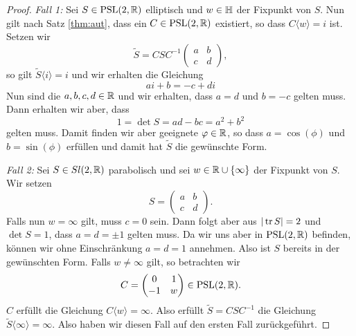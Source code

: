 \begin{proof}
  \emph{Fall 1:} Sei $S \in \operatorname{PSL}(2, \mathbb{R})$ elliptisch und $w \in \mathbb{H}$ der
  Fixpunkt von $S$. Nun gilt nach Satz \ref{thm:aut}, dass ein $C \in
  \operatorname{PSL}(2,\mathbb{R})$ existiert, so dass $C \langle w \rangle = i$ ist. Setzen
  wir
  \[
  \tilde S = CSC^{-1}
  \begin{pmatrix}
    a & b\\
    c & d
  \end{pmatrix},
  \]
  so gilt $\tilde S\langle i \rangle = i$ und wir erhalten die
  Gleichung
  \[
  ai +b = -c + di
  \]
  Nun sind die $a,b,c,d \in \mathbb{R}$ und wir erhalten, dass $a = d$ und $b
  = - c$ gelten muss. Dann erhalten wir aber, dass
  \[
  1 = \det S = ad - bc = a^2 + b^2
  \]
  gelten muss. Damit finden wir aber geeignete $\varphi \in \mathbb{R}$, so dass
  $a = \cos(\phi)$ und $b = \sin(\phi)$ erfüllen und damit hat $\tilde
  S$ die gewünschte Form.

  \emph{Fall 2:} Sei $S \in Sl(2, \mathbb{R})$ parabolisch und sei $w \in \mathbb{R}
  \cup \{\infty\}$ der Fixpunkt von $S$. Wir setzen
  \[
  S =
  \begin{pmatrix}
    a & b\\
    c & d
  \end{pmatrix}.
  \]
  Falls nun $w = \infty$ gilt, muss $c =0$ sein. Dann folgt aber aus
  $|\operatorname{tr} S| = 2$ und $\det S = 1$, dass $a = d = \pm 1$ gelten
  muss. Da wir uns aber in $\operatorname{PSL}(2,\mathbb{R})$ befinden, können wir ohne
  Einschränkung $a = d = 1$ annehmen. Also ist $S$ bereits in der
  gewünschten Form. Falls $w \neq \infty$ gilt, so betrachten wir
  \[
  C =
  \begin{pmatrix}
    0 & 1 \\
    -1 & w
  \end{pmatrix}
  \in \operatorname{PSL}(2,\mathbb{R}).
  \]
  $C$ erfüllt die Gleichung $C \langle w \rangle  = \infty$. Also
  erfüllt $\tilde S = C S C^{-1}$ die Gleichung $\tilde S\langle \infty
  \rangle = \infty$. Also haben wir diesen Fall auf den ersten Fall
  zurückgeführt.
  

\end{proof}
